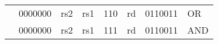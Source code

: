 \begin{table}[p]
\begin{small}
\begin{center}
\begin{tabular}{ccccccp{0.3in}p{0.3in}p{0.3in}cp{0.6in}l}
&
\multicolumn{4}{|c|}{0000000} &
\multicolumn{2}{c|}{rs2} &
\multicolumn{1}{c|}{rs1} &
\multicolumn{1}{c|}{110} &
\multicolumn{1}{c|}{rd} &
\multicolumn{1}{c|}{0110011} & OR \\
\cline{2-11}
  

&
\multicolumn{4}{|c|}{0000000} &
\multicolumn{2}{c|}{rs2} &
\multicolumn{1}{c|}{rs1} &
\multicolumn{1}{c|}{111} &
\multicolumn{1}{c|}{rd} &
\multicolumn{1}{c|}{0110011} & AND \\
\cline{2-11}
  

  

  

  

\end{tabular}
\end{center}
\end{small}


\end{table}
